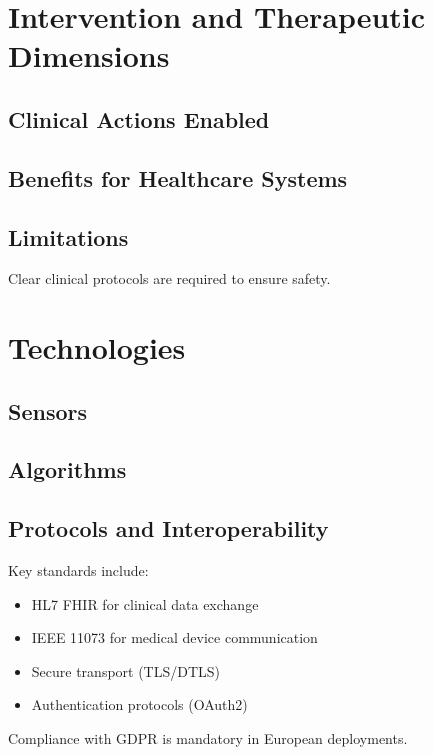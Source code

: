 \documentclass[conference]{IEEEtran}
\begin{document}
\section{Intervention and Therapeutic Dimensions}

\subsection{Clinical Actions Enabled}

\subsection{Benefits for Healthcare Systems}

\subsection{Limitations}

Clear clinical protocols are required to ensure safety.

\section{Technologies}

\subsection{Sensors}

\subsection{Algorithms}

\subsection{Protocols and Interoperability}

Key standards include:

\begin{itemize}
    \item HL7 FHIR for clinical data exchange
    \item IEEE 11073 for medical device communication
    \item Secure transport (TLS/DTLS)
    \item Authentication protocols (OAuth2)
\end{itemize}

Compliance with GDPR is mandatory in European deployments.
\end{document}
